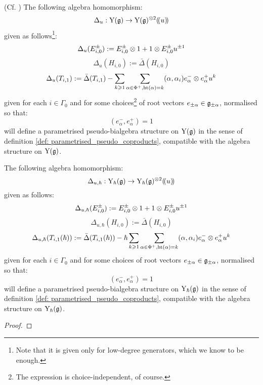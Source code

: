         \begin{theorem} \label{theorem: parametrised_pseudo_coproduct_on_yangians}
            (Cf. \cite[Theorem 6.2]{guay_nakajima_wendlandt_affine_yangian_coproduct}) The following algebra homomorphism:
                $$\Delta_u: \rmY(\g) \to \rmY(\g)^{\tensor 2}(\!(u)\!)$$
            given as follows\footnote{Note that it is given only for low-degree generators, which we know to be enough.}:
                $$\Delta_u(E_{i, 0}^{\pm}) := E_{i, 0}^{\pm} \tensor 1 + 1 \tensor E_{i, 0}^{\pm} u^{\pm 1}$$
                $$\Delta_u(H_{i, 0}) := \bar{\Delta}(H_{i, 0})$$
                $$\Delta_u(T_{i, 1}) := \bar{\Delta}(T_{i, 1}) - \sum_{k \geq 1} \sum_{\alpha \in \Phi^+, \height(\alpha) = k} (\alpha, \alpha_i) e_{\alpha}^- \tensor e_{\alpha}^+ u^k$$
            given for each $i \in \Gamma_0$ and for some choices\footnote{The expression is choice-independent, of course.} of root vectors $e_{\pm\alpha} \in \mathfrak{g}_{\pm\alpha}$, normalised so that:
                $$(e_{\alpha}^-, e_{\alpha}^+) = 1$$
            will define a parametrised pseudo-bialgebra structure on $\mathrm{Y}(\mathfrak{g})$ in the sense of definition \ref{def: parametrised_pseudo_coproducts}, compatible with the algebra structure on $\mathrm{Y}(\mathfrak{g})$.
        \end{theorem}

        \begin{theorem} \label{theorem: parametrised_pseudo_coproduct_on_formal_yangians}
            The following algebra homomorphism:
                $$\Delta_{u, \hbar}: \rmY_{\hbar}(\g) \to \rmY_{\hbar}(\g)^{\tensor 2}(\!(u)\!)$$
            given as follows:
                $$\Delta_{u, \hbar}(E_{i, 0}^{\pm}) := E_{i, 0}^{\pm} \tensor 1 + 1 \tensor E_{i, 0}^{\pm} u^{\pm 1}$$
                $$\Delta_{u, \hbar}(H_{i, 0}) := \bar{\Delta}(H_{i, 0})$$
                $$\Delta_{u, \hbar}(T_{i, 1}(\hbar)) := \bar{\Delta}(T_{i, 1}(\hbar)) - \hbar \sum_{k \geq 1} \sum_{\alpha \in \Phi^+, \height(\alpha) = k} (\alpha, \alpha_i) e_{\alpha}^- \tensor e_{\alpha}^+ u^k$$
            given for each $i \in \Gamma_0$ and for some choices of root vectors $e_{\pm\alpha} \in \mathfrak{g}_{\pm\alpha}$, normalised so that:
                $$(e_{\alpha}^-, e_{\alpha}^+) = 1$$
            will define a parametrised pseudo-bialgebra structure on $\mathrm{Y}_{\hbar}(\mathfrak{g})$ in the sense of definition \ref{def: parametrised_pseudo_coproducts}, compatible with the algebra structure on $\mathrm{Y}_{\hbar}(\mathfrak{g})$.
        \end{theorem}
            \begin{proof}
                
            \end{proof}

